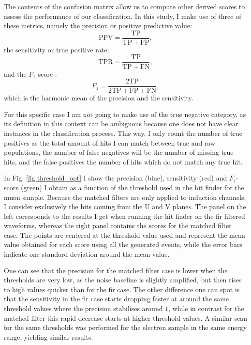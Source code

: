 The contents of the confusion matrix allow us to compute other derived scores to assess the performance of our classification. In this study, I make use of three of these metrics, namely the precision or positive predictive value:
\begin{equation}
	\mathrm{PPV} = \frac{\mathrm{TP}}{\mathrm{TP} + \mathrm{FP}},
\end{equation}
the sensitivity or true positive rate:
\begin{equation}
	\mathrm{TPR} = \frac{\mathrm{TP}}{\mathrm{TP} + \mathrm{FN}},
\end{equation}
and the $F_{1}$ score \cite{Taha2015}:
\begin{equation}
	F_{1} = \frac{\mathrm{2 TP}}{2\mathrm{TP} + \mathrm{FP} + \mathrm{FN}},
\end{equation}
which is the harmonic mean of the precision and the sensitivity.

For this specific case I am not going to make use of the true negative category, as its definition in this context can be ambiguous because one does not have clear instances in the classification process. This way, I only count the number of true positives as the total amount of hits I can match between true and raw populations, the number of false negatives will be the number of missing true hits, and the false positives the number of hits which do not match any true hit.

In Fig. \ref{fig:threshold_opt} I show the precision (blue), sensitivity (red) and $F_{1}$-score (green) I obtain as a function of the threshold used in the hit finder for the muon sample. Because the matched filters are only applied to induction channels, I consider exclusively the hits coming from the U and V planes. The panel on the left corresponds to the results I get when running the hit finder on the \gls{fir} filtered waveforms, whereas the right panel contains the scores for the matched filter case. The points are centered at the threshold value used and represent the mean value obtained for each score using all the generated events, while the error bars indicate one standard deviation around the mean value.

One can see that the precision for the matched filter case is lower when the thresholds are very low, as the noise baseline is slightly amplified, but then rises to high values quicker than for the \gls{fir} case. The other difference one can spot is that the sensitivity in the \gls{fir} case starts dropping faster at around the same threshold values where the precision stabilises around $1$, while in contrast for the matched filter this rapid decrease starts at higher threshold values. A similar scan for the same thresholds was performed for the electron sample in the same energy range, yielding similar results.

